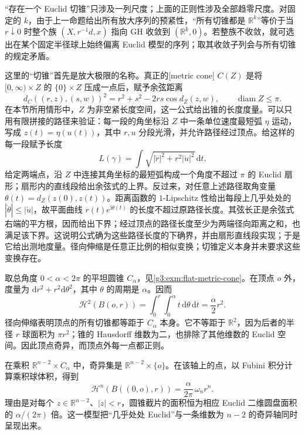 “存在一个 Euclid 切锥”只涉及一列尺度；上面的正则性涉及全部趋零尺度。对固定的 \(k\)，由于上一命题给出所有放大序列的预紧性，“所有切锥都是 \(\mathbb R^k\)”等价于当 \(r\downarrow0\) 时整个族 \((X,r^{-1}d,x)\) 指向 GH 收敛到 \((\mathbb R^k,0)\)。若整族不收敛，就可选出在某个固定半径球上始终偏离 Euclid 模型的序列；取其收敛子列会与所有切锥的规定矛盾。

\ProseParagraphBreak
这里的“切锥”首先是放大极限的名称。真正的[metric cone] \(C(Z)\) 是将 \([0,\infty)\times Z\) 的 \(\{0\}\times Z\) 压成一点后，赋予余弦距离
\begin{equation}\label{g3:eq:ricci-metric-cone-distance}
	 d_C((r,z),(s,w))^2
	 =r^2+s^2-2rs\cos d_Z(z,w),
	 \qquad \operatorname{diam}Z\le\pi.
\end{equation}
在本节所用情形中，\(Z\) 为非空紧长度空间，这一公式给出锥的长度度量。可以只用有限拼接的路径来验证：每一段的角坐标沿 \(Z\) 中一条单位速度最短弧 \(\eta\) 运动，写成 \(z(t)=\eta(u(t))\)，其中 \(r,u\) 分段光滑，并允许路径经过顶点。给这样的每一段赋予长度
\[
	 L(\gamma)=\int\sqrt{|\dot r|^2+r^2|\dot u|^2}\,\mathrm dt.
\]
给定两端点，沿 \(Z\) 中连接其角坐标的最短弧构成一个角度不超过 \(\pi\) 的 Euclid 扇形；扇形内的直线段给出余弦式的上界。反过来，对任意上述路径取角变量 \(\theta(t)=d_Z(z(0),z(t))\)。距离函数的 \(1\)-Lipschitz 性给出每段上几乎处处的 \(|\dot\theta|\le|\dot u|\)，故平面曲线 \(r(t)e^{\mathrm i\theta(t)}\) 的长度不超过原路径长度。其弦长正是余弦式右端的平方根，因而给出下界；经过顶点的路径长度至少为两端径向距离之和，也满足该下界。这说明公式确为这些路径长度的下确界，并由扇形直线段实现；于是它给出测地度量。径向伸缩是任意正比例的相似变换；切锥定义本身并未要求这些变换存在。

\begin{example}\label{g3:exm:cone-density-singularity}
	取总角度 \(0<\alpha<2\pi\) 的平坦圆锥 \(C_\alpha\)，见\cref{g3:exm:flat-metric-cone}。在顶点 \(o\) 外，度量为 \(\mathrm dr^2+r^2\mathrm d\theta^2\)，其中 \(\theta\) 的周期是 \(\alpha\)。因而
	\[
		\mathcal H^2(B(o,r))
		=\int_0^r\int_0^\alpha t\,\mathrm d\theta\,\mathrm dt
		=\frac\alpha2r^2.
	\]
	径向伸缩表明顶点的所有切锥都等距于 \(C_\alpha\) 本身。它不等距于 \(\mathbb R^2\)，因为后者的半径 \(r\) 球面积为 \(\pi r^2\)；锥的 Hausdorff 维数为二，也排除了其他维数的 Euclid 空间。因此顶点奇异，而顶点外每一点都正则。

	在乘积 \(\mathbb R^{n-2}\times C_\alpha\) 中，奇异集是 \(\mathbb R^{n-2}\times\{o\}\)。在该轴上的点，以 Fubini 积分计算乘积球体积，得到
	\[
		\mathcal H^n(B((0,o),r))
		=\frac\alpha{2\pi}\,\omega_nr^n.
	\]
	理由是对每个 \(z\in\mathbb R^{n-2}\)、\(|z|<r\)，圆锥截片的面积恒为相应 Euclid 二维圆盘面积的 \(\alpha/(2\pi)\) 倍。这一模型把“几乎处处 Euclid”与一条维数为 \(n-2\) 的奇异轴同时呈现出来。
\end{example}

